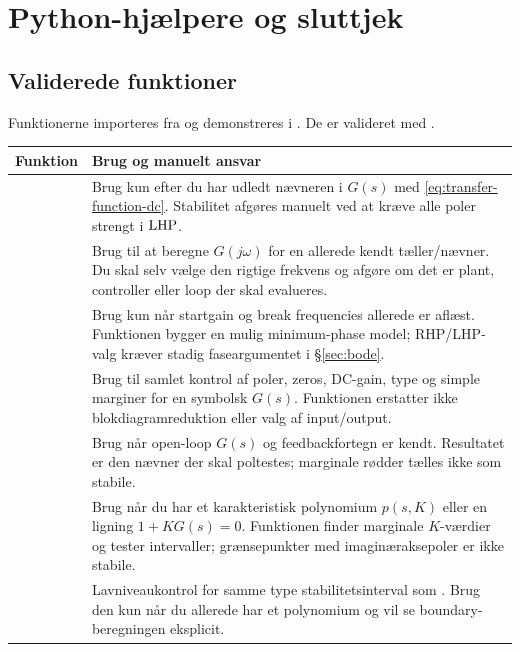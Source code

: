 \section{Python-hjælpere og sluttjek}
\label{sec:python}

\subsection{Validerede funktioner}

Funktionerne importeres fra  og demonstreres i
. De er valideret med
.

\begin{tabularx}{\textwidth}{@{}p{}Y@{}}
\toprule
Funktion & Brug og manuelt ansvar \\
\midrule
{} & Brug kun efter du har udledt nævneren i \(G(s)\) med \eqref{eq:transfer-function-dc}. Stabilitet afgøres manuelt ved at kræve alle poler strengt i \(\mathrm{LHP}\).\\
 & Brug til at beregne \(G(j\omega)\) for en allerede kendt tæller/nævner. Du skal selv vælge den rigtige frekvens og afgøre om det er plant, controller eller loop der skal evalueres.\\
 & Brug kun når startgain og break frequencies allerede er aflæst. Funktionen bygger en mulig minimum-phase model; RHP/LHP-valg kræver stadig faseargumentet i \S\ref{sec:bode}.\\
 & Brug til samlet kontrol af poler, zeros, DC-gain, type og simple marginer for en symbolsk \(G(s)\). Funktionen erstatter ikke blokdiagramreduktion eller valg af input/output.\\
 & Brug når open-loop \(G(s)\) og feedbackfortegn er kendt. Resultatet er den nævner der skal poltestes; marginale rødder tælles ikke som stabile.\\
 & Brug når du har et karakteristisk polynomium \(p(s,K)\) eller en ligning \(1+KG(s)=0\). Funktionen finder marginale \(K\)-værdier og tester intervaller; grænsepunkter med imaginæraksepoler er ikke stabile.\\
 & Lavniveaukontrol for samme type stabilitetsinterval som . Brug den kun når du allerede har et polynomium og vil se boundary-beregningen eksplicit.\\

\end{tabularx}
